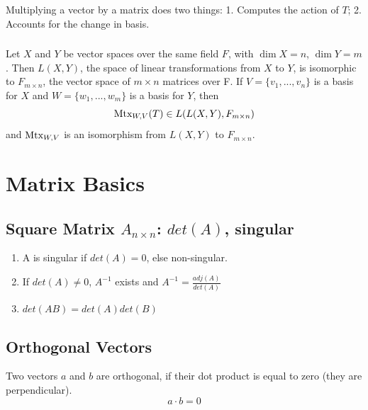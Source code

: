 \documentclass[11pt]{elegantbook}
\begin{document}
Multiplying a vector by a matrix does two things: 1. Computes the action of $T$; 2. Accounts for the change in basis.


\subsection{}
\begin{theorem}[]
    Let $X$ and $Y$ be vector spaces over the same field $F$, with $\dim X = n$, $\dim Y = m$. Then $L(X, Y)$, the space of linear transformations from $X$ to $Y$, is isomorphic to $F_{m\times n}$, the vector space of $m\times n$ matrices over F. If $V = \{v_1, . . . , v_n\}$ is a basis for $X$ and $W = \{w_1, . . . , w_m\}$ is a basis for $Y$, then
    $$\textnormal{Mtx}_{W,V}(T)\in L(L(X,Y),F_{m\times n})$$
    and $\textnormal{Mtx}_{W,V}$ is an isomorphism from $L(X, Y)$ to $F_{m\times n}$.
\end{theorem}
























\chapter{Matrix Basics}
\section{Square Matrix $A_{n\times n}$: $det(A)$, singular}
\begin{enumerate}
    \item A is singular if $det(A)=0$, else non-singular.
    \item If $det(A)\neq 0$, $A^{-1}$ exists and $A^{-1}=\frac{adj(A)}{det(A)}$
    \item $det(AB)=det(A)det(B)$
\end{enumerate}

\section{Orthogonal Vectors}
Two vectors $a$ and $b$ are orthogonal, if their dot product is equal to zero (they are perpendicular). $$a\cdot b=0$$
\end{document}
